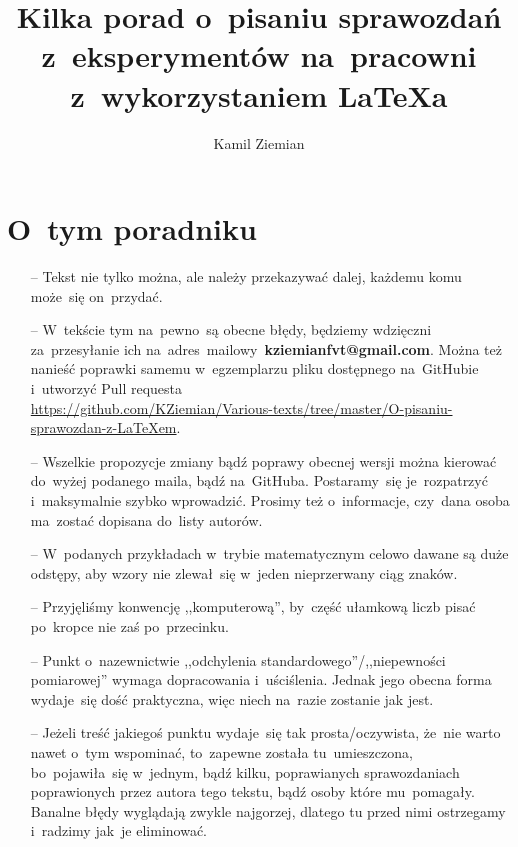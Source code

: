 \documentclass[a4paper,11pt]{article}
\title{Kilka porad o~pisaniu sprawozdań z~eksperymentów na~pracowni
  z~wykorzystaniem \LaTeX a}
\author{Kamil Ziemian}
\newcommand{\tb}{\textbf}
\begin{document}


\maketitle



\section*{O~tym poradniku}
\label{sec:otym}


\begin{itemize}
\item[--] Tekst nie tylko można, ale należy przekazywać dalej, każdemu
  komu może~się on~przydać.

\item[--] W~tekście tym na~pewno~są obecne błędy, będziemy wdzięczni
  za~przesyłanie ich na~adres~mailowy~\tb{kziemianfvt@gmail.com}.
  Można też nanieść poprawki samemu w~egzemplarzu pliku dostępnego
  na~GitHubie
  i~utworzyć Pull requesta \\
  \href{https://github.com/KZiemian/Various-texts/tree/master/O-pisaniu-sprawozdan-z-LaTeXem}{https://github.com/KZiemian/Various-texts/tree/master/O-pisaniu-sprawozdan-z-LaTeXem}.

\item[--] Wszelkie propozycje zmiany bądź poprawy obecnej wersji można
  kierować do~wyżej podanego maila, bądź na~GitHuba. Postaramy~się
  je~rozpatrzyć i~maksymalnie szybko wprowadzić. Prosimy też
  o~informacje, czy~dana osoba ma~zostać dopisana do~listy autorów.

\item[--] W~podanych przykładach w~trybie matematycznym celowo dawane
  są duże odstępy, aby wzory nie zlewał~się w~jeden nieprzerwany ciąg
  znaków.

\item[--] Przyjęliśmy konwencję ,,komputerową'', by~część ułamkową
  liczb pisać po~kropce nie zaś po~przecinku.

\item[--] Punkt o~nazewnictwie ,,odchylenia
  standardowego''/,,niepewności pomiarowej'' wymaga dopracowania
  i~uściślenia. Jednak jego obecna forma wydaje~się dość praktyczna,
  więc niech na~razie zostanie jak jest.

\item[--] Jeżeli treść jakiegoś punktu wydaje~się tak
  prosta/oczywista, że~nie warto nawet o~tym wspominać, to~zapewne
  została tu~umieszczona, bo~pojawiła~się w~jednym, bądź kilku,
  poprawianych sprawozdaniach poprawionych przez autora tego tekstu,
  bądź osoby które mu~pomagały. Banalne błędy wyglądają zwykle
  najgorzej, dlatego tu przed nimi ostrzegamy i~radzimy jak~je
  eliminować.


\end{itemize}
\end{document}
